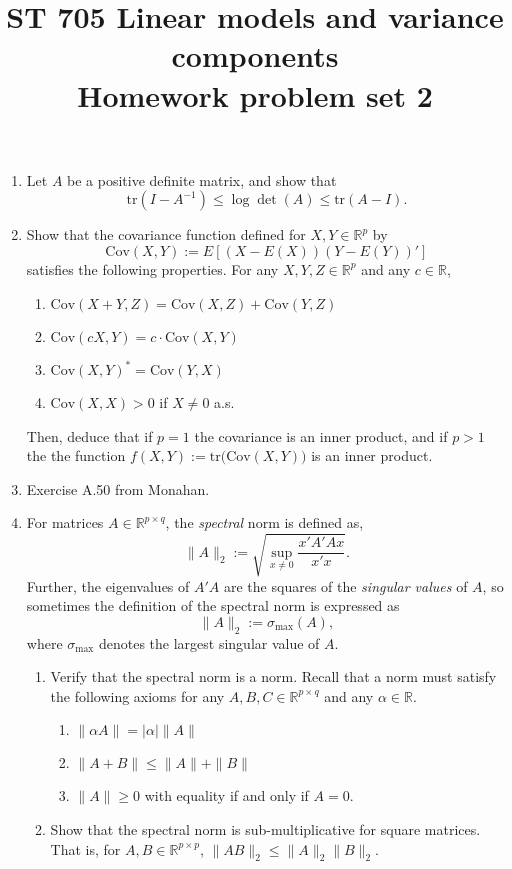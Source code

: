 \documentclass[11pt]{article}
\title{ST 705 Linear models and variance components \\ 
        Homework problem set 2}
\begin{document}
\maketitle

\begin{enumerate}

\item Let $A$ be a positive definite matrix, and show that 
\[
\text{tr}(I - A^{-1}) \le \log\det(A) \le \text{tr}(A - I).
\]

\item Show that the covariance function defined for $X, Y \in \mathbb{R}^{p}$ by
\[
\text{Cov}(X,Y) := E[(X - E(X))(Y - E(Y))']
\]
satisfies the following properties.  For any $X, Y, Z \in \mathbb{R}^{p}$ and any $c \in \mathbb{R}$,
\begin{enumerate}
\item $\text{Cov}(X+Y,Z) = \text{Cov}(X,Z) + \text{Cov}(Y,Z)$
\item $\text{Cov}(cX,Y) = c\cdot \text{Cov}(X,Y)$
\item $\text{Cov}(X,Y)^{*} = \text{Cov}(Y,X)$
\item $\text{Cov}(X,X) > 0$ if $X \ne 0$ a.s.
\end{enumerate}
Then, deduce that if $p = 1$ the covariance is an inner product, and if $p > 1$ the the function $f(X,Y) := \text{tr}\big(\text{Cov}(X,Y)\big)$ is an inner product.

\item Exercise A.50 from Monahan.

\item For matrices $A \in \mathbb{R}^{p\times q}$, the \textit{spectral} norm is defined as,
\[
\|A\|_{2} := \sqrt{\sup_{x\ne0}\frac{x'A'Ax}{x'x}}.
\]
Further, the eigenvalues of $A'A$ are the squares of the \textit{singular values} of $A$, so sometimes the definition of the spectral norm is expressed as
 \[
\|A\|_{2} := \sigma_{\max}(A),
\]
where $\sigma_{\max}$ denotes the largest singular value of $A$. 
\begin{enumerate}
\item Verify that the spectral norm is a norm.  Recall that a norm must satisfy the following axioms for any $A,B,C \in \mathbb{R}^{p\times q}$ and any $\alpha \in \mathbb{R}$.
\begin{enumerate}
\item $\|\alpha A\| = |\alpha|\|A\|$
\item $\|A + B\| \le \|A\| + \|B\|$
\item $\|A\| \ge 0$ with equality if and only if $A = 0$.
\end{enumerate}
\item Show that the spectral norm is sub-multiplicative for square matrices.  That is, for $A,B \in \mathbb{R}^{p\times p}$, $\|AB\|_{2} \le \|A\|_{2}\|B\|_{2}$.  
\end{enumerate}


\end{enumerate}
\end{document}
